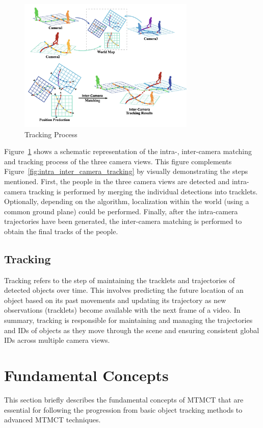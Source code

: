 \begin{figure}[ht]
    \centering
    \includegraphics[width=0.75\textwidth]{resources/fig/Ma21-tracking_process.png}
    \caption[Tracking Process]{Tracking Process~\cite[source image:][Fig.~1]{Ma21}}\label{fig:projection}
\end{figure}

Figure~\ref{fig:projection} shows a schematic representation of the intra-, inter-camera matching and tracking process of the three camera views. This figure complements Figure~\ref{fig:intra_inter_camera_tracking} by visually demonstrating the steps mentioned. First, the people in the three camera views are detected and intra-camera tracking is performed by merging the individual detections into tracklets. Optionally, depending on the algorithm, localization within the world (using a common ground plane) could be performed. Finally, after the intra-camera trajectories have been generated, the inter-camera matching is performed to obtain the final tracks of the people.

\subsection{Tracking}\label{subsec:tracking}
Tracking refers to the step of maintaining the tracklets and trajectories of detected objects over time. This involves predicting the future location of an object based on its past movements and updating its trajectory as new observations (tracklets) become available with the next frame of a video. In summary, tracking is responsible for maintaining and managing the trajectories and IDs of objects as they move through the scene and ensuring consistent global IDs across multiple camera views.

\section{Fundamental Concepts}\label{sec:fundamental_concepts}
This section briefly describes the fundamental concepts of MTMCT that are essential for following the progression from basic object tracking methods to advanced MTMCT techniques.

